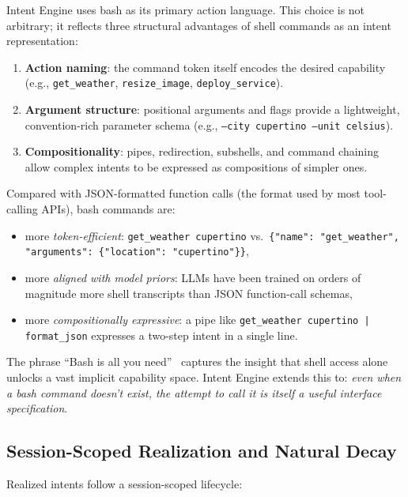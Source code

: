 \documentclass[11pt]{article}
\begin{document}
Intent Engine uses bash as its primary action language. This choice is not arbitrary; it reflects three structural advantages of shell commands as an intent representation:

\begin{enumerate}[leftmargin=*]
  \item \textbf{Action naming}: the command token itself encodes the desired capability (e.g., \texttt{get\_weather}, \texttt{resize\_image}, \texttt{deploy\_service}).
  \item \textbf{Argument structure}: positional arguments and flags provide a lightweight, convention-rich parameter schema (e.g., \texttt{--city cupertino --unit celsius}).
  \item \textbf{Compositionality}: pipes, redirection, subshells, and command chaining allow complex intents to be expressed as compositions of simpler ones.
\end{enumerate}

Compared with JSON-formatted function calls (the format used by most tool-calling APIs), bash commands are:
\begin{itemize}[leftmargin=*]
  \item more \emph{token-efficient}: \texttt{get\_weather cupertino} vs.\ \texttt{\{"name": "get\_weather", "arguments": \{"location": "cupertino"\}\}},
  \item more \emph{aligned with model priors}: LLMs have been trained on orders of magnitude more shell transcripts than JSON function-call schemas,
  \item more \emph{compositionally expressive}: a pipe like \texttt{get\_weather cupertino | format\_json} expresses a two-step intent in a single line.
\end{itemize}

The phrase ``Bash is all you need''~\citep{shihipar2026bash} captures the insight that shell access alone unlocks a vast implicit capability space.
Intent Engine extends this to: \emph{even when a bash command doesn't exist, the attempt to call it is itself a useful interface specification}.

\subsection{Session-Scoped Realization and Natural Decay}
\label{sec:lifecycle}

Realized intents follow a session-scoped lifecycle:
\end{document}
